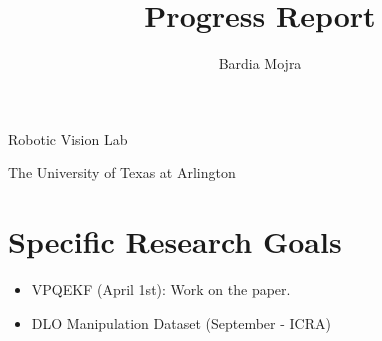 \documentclass[11pt]{article}
\title{Progress Report}
\author{Bardia Mojra}
\begin{document}
\maketitle
\thispagestyle{empty}

\bigskip
\bigskip
\begin{center}
      Robotic Vision Lab
\end{center}

\begin{center}
      The University of Texas at Arlington
\end{center}

\newpage

\section{Specific Research Goals}
\begin{itemize}
      \item VPQEKF (April 1st): Work on the paper.
      \item DLO Manipulation Dataset (September - ICRA)
\end{itemize}
\end{document}
